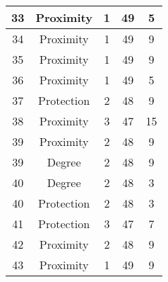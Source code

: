 \documentclass[results.tex]{subfiles}
\begin{document}
\begin{center}
\begin{tabular}{| c || c | c | c | c |}
            \hline
            33                      & Proximity                    & 1                      & 49                      & 5                    \\
            \hline
            34                      & Proximity                    & 1                      & 49                      & 9                    \\
            \hline
            35                      & Proximity                    & 1                      & 49                      & 9                    \\
            \hline
            36                      & Proximity                    & 1                      & 49                      & 5                    \\
            \hline
            37                      & Protection                   & 2                      & 48                      & 9                    \\
            \hline
            38                      & Proximity                    & 3                      & 47                      & 15                   \\
            \hline
            39                      & Proximity                    & 2                      & 48                      & 9                    \\
            \hline
            39                      & Degree                       & 2                      & 48                      & 9                    \\
            \hline
            40                      & Degree                       & 2                      & 48                      & 3                    \\
            \hline
            40                      & Protection                   & 2                      & 48                      & 3                    \\
            \hline
            41                      & Protection                   & 3                      & 47                      & 7                    \\
            \hline
            42                      & Proximity                    & 2                      & 48                      & 9                    \\
            \hline
            43                      & Proximity                    & 1                      & 49                      & 9                    \\

\end{tabular}
\end{center}
\end{document}
